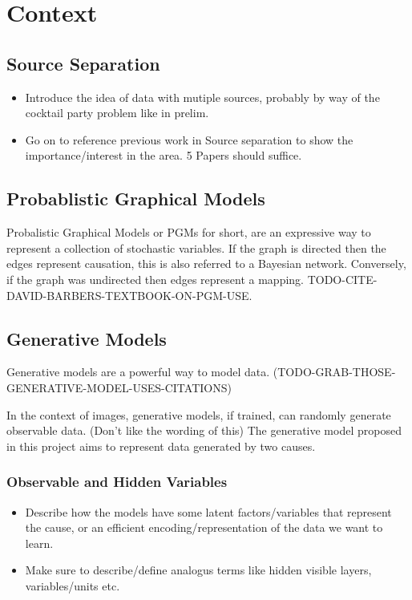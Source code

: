 \section{Context}

\subsection{Source Separation}

\begin{itemize}
  \item Introduce the idea of data with mutiple sources, probably by way of the cocktail party problem like in prelim.
  \item Go on to reference previous work in Source separation to show the importance/interest in the area. 5 Papers should suffice.
\end{itemize}

\subsection{Probablistic Graphical Models}

Probalistic Graphical Models or PGMs for short, are an expressive way to represent a collection of stochastic  variables. If the graph is directed then the edges represent causation, this is also referred to a Bayesian network. Conversely, if the graph was undirected then edges represent a mapping. TODO-CITE-DAVID-BARBERS-TEXTBOOK-ON-PGM-USE.

\subsection{Generative Models}

Generative models are a powerful way to model data. (TODO-GRAB-THOSE-GENERATIVE-MODEL-USES-CITATIONS)

In the context of images, generative models, if trained, can randomly generate observable data. (Don't like the wording of this)
The generative model proposed in this project aims to represent data generated by two causes.

  \subsubsection{Observable and Hidden Variables}

  \begin{itemize}
    \item Describe how the models have some latent factors/variables that represent the cause, or an efficient encoding/representation of the data we want to learn.
    \item Make sure to describe/define analogus terms like hidden visible layers, variables/units etc.
  \end{itemize}

